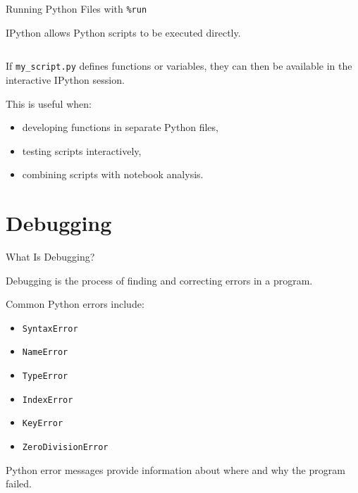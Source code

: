 \documentclass[aspectratio=43]{beamer}
\begin{document}
\begin{frame}[fragile]{Running Python Files with \texttt{\%run}}

IPython allows Python scripts to be executed directly.

\begin{lstlisting}[language=Python]
%run my_script.py
\end{lstlisting}

If \texttt{my\_script.py} defines functions or variables, they can then
be available in the interactive IPython session.

\vspace{0.3cm}

This is useful when:

\begin{itemize}
  \item developing functions in separate Python files,
  \item testing scripts interactively,
  \item combining scripts with notebook analysis.
\end{itemize}

\end{frame}

\section{Debugging}

\begin{frame}{What Is Debugging?}

Debugging is the process of finding and correcting errors in a program.

\vspace{0.3cm}

Common Python errors include:

\begin{itemize}
  \item \texttt{SyntaxError}
  \item \texttt{NameError}
  \item \texttt{TypeError}
  \item \texttt{IndexError}
  \item \texttt{KeyError}
  \item \texttt{ZeroDivisionError}
\end{itemize}

\vspace{0.3cm}

Python error messages provide information about where and why the program failed.

\end{frame}
\end{document}
